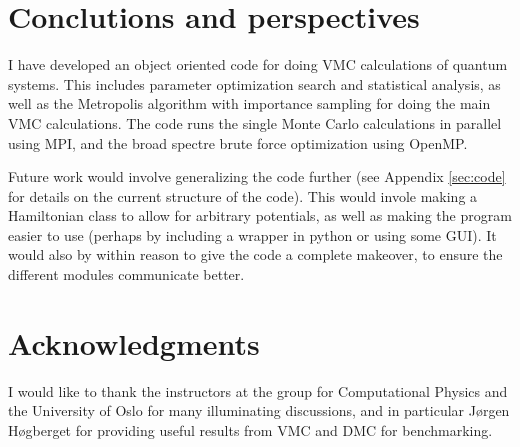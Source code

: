 \documentclass[aps,prc,twocolumn,floatfix]{revtex4}
\begin{document}
\section{Conclutions and perspectives}
I have developed an object oriented code for doing VMC calculations of quantum systems. This includes parameter optimization search and statistical analysis, as well as the Metropolis algorithm with importance sampling for doing the main VMC calculations. The code runs the single Monte Carlo calculations in parallel using MPI, and the broad spectre brute force optimization using OpenMP.  

Future work would involve generalizing the code further (see Appendix \ref{sec:code} for  details on the current structure of the code). This would invole making a Hamiltonian class to allow for arbitrary potentials, as well as making the program easier to use (perhaps by including a wrapper in python or using some GUI). It would also by within reason to give the code a complete makeover, to ensure the different modules communicate better.

\section*{Acknowledgments}

I would like to thank the instructors at the group for Computational Physics and the University of Oslo for many illuminating discussions, and in particular Jørgen Høgberget for providing useful results from VMC and DMC for benchmarking. 
\end{document}
